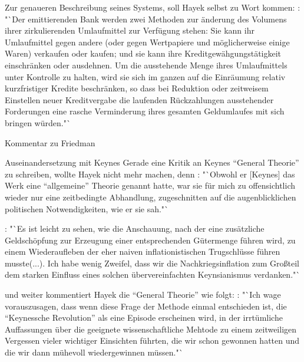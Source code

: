 \documentclass[
    onecolumn,
    a4paper,
    abstracton,
    parskip=half
    ,final
    ]{scrartcl}
\begin{document}
Zur genaueren Beschreibung seines Systems, soll Hayek selbst zu Wort kommen: \citep[vgl.][S.45]{Hayek1977}: "`Der emittierenden Bank werden zwei Methoden zur {\"a}nderung des Volumens ihrer zirkulierenden Umlaufmittel zur Verf{\"u}gung stehen: Sie kann ihr Umlaufmittel gegen andere (oder gegen Wertpapiere und m{\"o}glicherweise einige Waren) verkaufen oder kaufen; und sie kann ihre Kreditgew{\"a}hgungst{\"a}tigkeit einschr{\"a}nken oder ausdehnen. Um die ausstehende Menge ihres Umlaufmittels unter Kontrolle zu halten, wird sie sich im ganzen auf die Einr{\"a}umung relativ kurzfristiger Kredite beschr{\"a}nken, so dass bei Reduktion oder zeitweisem Einstellen neuer Kreditvergabe die laufenden R{\"u}ckzahlungen ausstehender Forderungen eine rasche Verminderung ihres gesamten Geldumlaufes mit sich bringen w{\"u}rden."`


Kommentar zu Friedman

Auseinandersetzung mit Keynes
Gerade eine Kritik an Keynes "`General Theorie"'  zu schreiben, wollte Hayek nicht mehr machen, denn \citep[vgl.][S.91]{Hayek1969}: "`Obwohl er [Keynes] das Werk eine "`allgemeine"' Theorie genannt hatte, war sie f{\"u}r mich zu offensichtlich wieder nur eine zeitbedingte Abhandlung, zugeschnitten auf die augenblicklichen politischen Notwendigkeiten, wie er sie sah."`

\citep[vgl.][S.93]{Hayek1969}: "`Es ist leicht zu sehen, wie die Anschauung, nach der eine zus{\"a}tzliche Geldsch{\"o}pfung zur Erzeugung einer entsprechenden G{\"u}termenge f{\"u}hren wird, zu einem Wiederaufleben der eher naiven inflationistischen Trugschl{\"u}sse f{\"u}hren musste(...). Ich habe wenig Zweifel, dass wir die Nachkriegsinflation zum Gro{\ss}teil dem starken Einfluss eines solchen {\"u}bervereinfachten Keynsianismus verdanken."`

und weiter kommentiert Hayek die "`General Theorie"' wie folgt:
\citep[vgl.][S.96]{Hayek1969}: "`Ich wage vorauszusagen, dass wenn diese Frage der Methode einmal entschieden ist, die "`Keynessche Revolution"' als eine Episode erscheinen wird, in der irrt{\"u}mliche Auffassungen {\"u}ber die geeignete wissenschaftliche Mehtode zu einem zeitweiligen Vergessen vieler wichtiger Einsichten f{\"u}hrten, die wir schon gewonnen hatten und die wir dann m{\"u}hevoll wiedergewinnen m{\"u}ssen."`
\end{document}
